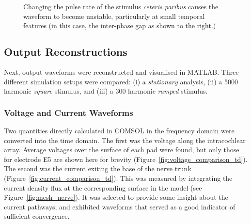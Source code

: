 \begin{figure}
	\caption[Effect of changing the pulse rate]{Changing the pulse rate of the
	stimulus \textit{ceteris paribus} causes the waveform to become unstable,
	particularly at small temporal features (in this case, the inter-phase gap as
	shown to the right.)}
	\label{fig:pulse_rate}
\end{figure}

\subsection{Output Reconstructions}

Next, output waveforms were reconstructed and visualised in MATLAB. Three
different simulation setups were compared: (i) a \emph{stationary} analysis,
(ii) a 5000 harmonic \emph{square} stimulus, and (iii) a 300 harmonic
\emph{ramped} stimulus.

\subsubsection{Voltage and Current Waveforms}

Two quantities directly calculated in COMSOL in the frequency domain were
converted into the time domain. The first was the voltage along the
intracochlear array. Average voltages over the surface of each pad were found,
but only those for electrode E5 are shown here for brevity
(Figure~\ref{fig:voltage_comparison_td}). The second was the current exiting the
base of the nerve trunk (Figure~\ref{fig:current_comparison_td}). This was
measured by integrating the current density flux at the corresponding surface in
the model (see Figure~\ref{fig:mesh_nerve}). It was selected to provide some
insight about the current pathways, and exhibited waveforms that served as a
good indicator of sufficient convergence.

